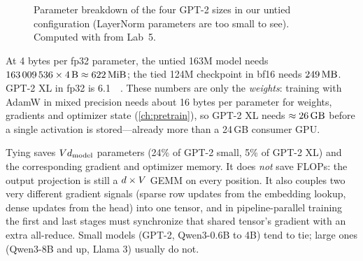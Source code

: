 \begin{figure}[t]
\centering
{}
\caption{Parameter breakdown of the four GPT-2 sizes in our untied configuration (LayerNorm
parameters are too small to see). Computed with  from Lab~5.}
\label{fig:gpt:parambreakdown}
\end{figure}

\begin{napkinmath}
At 4 bytes per fp32 parameter, the untied 163M model needs
$\num{163009536}\times4\,\text{B}\approx\SI{622}{\mebi\byte}$; the tied 124M checkpoint in bf16 needs
$\SI{249}{\mega\byte}$. GPT-2 XL in fp32 is \SI{6.1}{\gibi\byte}. These numbers are only the
\emph{weights}: training with AdamW in mixed precision needs about 16 bytes per parameter for
weights, gradients and optimizer state (\cref{ch:pretrain}), so GPT-2 XL needs
$\approx\SI{26}{\giga\byte}$ before a single activation is stored---already more than a 24\,GB
consumer GPU.
\end{napkinmath}

\begin{systemslens}
Tying saves $Vd_{\text{model}}$ parameters (24\% of GPT-2 small, 5\% of GPT-2 XL) and the
corresponding gradient and optimizer memory. It does \emph{not} save FLOPs: the output projection
is still a $d\times V$ GEMM on every position. It also couples two very different gradient
signals (sparse row updates from the embedding lookup, dense updates from the head) into one
tensor, and in pipeline-parallel training the first and last stages must synchronize that shared
tensor's gradient with an extra all-reduce. Small models (GPT-2, Qwen3-0.6B to 4B) tend to tie;
large ones (Qwen3-8B and up, Llama 3) usually do not.
\end{systemslens}

